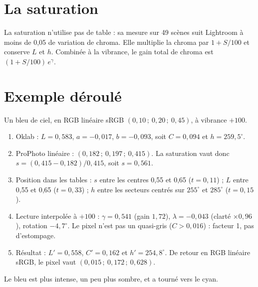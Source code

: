 \section{La saturation}
La saturation n'utilise pas de table : sa mesure sur 49 scènes suit
Lightroom à moins de 0,05 de variation de chroma. Elle multiplie la chroma
par $1+S/100$ et conserve $L$ et $h$. Combinée à la vibrance, le gain total de
chroma est $(1+S/100)\,e^{\gamma}$.

\section{Exemple déroulé}
Un bleu de ciel, en RGB linéaire sRGB $(0{,}10\,;\ 0{,}20\,;\ 0{,}45)$, à
vibrance $+100$.
\begin{enumerate}
\item Oklab : $L=0{,}583$, $a=-0{,}017$, $b=-0{,}093$, soit $C=0{,}094$ et
$h=259{,}5^\circ$.
\item ProPhoto linéaire : $(0{,}182\,;\ 0{,}197\,;\ 0{,}415)$. La saturation
vaut donc $s=(0{,}415-0{,}182)/0{,}415$, soit $s=0{,}561$.
\item Position dans les tables : $s$ entre les centres 0,55 et 0,65
($t=0{,}11$) ; $L$ entre 0,55 et 0,65 ($t=0{,}33$) ; $h$ entre les secteurs
centrés sur $255^\circ$ et $285^\circ$ ($t=0{,}15$).
\item Lecture interpolée à $+100$ : $\gamma=0{,}541$ (gain $1{,}72$),
$\lambda=-0{,}043$ (clarté $\times0{,}96$), rotation $-4{,}7^\circ$. Le pixel
n'est pas un quasi-gris ($C>0{,}016$) : facteur 1, pas d'estompage.
\item Résultat : $L'=0{,}558$, $C'=0{,}162$ et $h'=254{,}8^\circ$. De retour en RGB
linéaire sRGB, le pixel vaut $(0{,}015\,;\ 0{,}172\,;\ 0{,}628)$.
\end{enumerate}
Le bleu est plus intense, un peu plus sombre, et a tourné vers le cyan.
